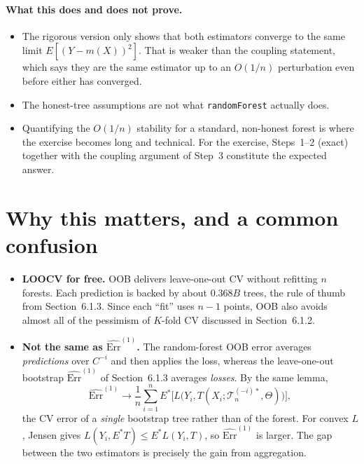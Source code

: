 \documentclass[11pt,a4paper]{article}
\theoremstyle{remark}
\newcommand{\cT}{\mathcal T}
\newcommand{\1}{\mathbf 1}
\newcommand{\Err}{\widehat{\mathrm{Err}}}
\newcommand{\Tmi}[1]{\cT^{(-i)*}_{#1}}
\begin{document}
\paragraph{What this does and does not prove.}
\begin{itemize}
\item The rigorous version only shows that both estimators converge to the same limit $E[(Y-m(X))^2]$. That is weaker than the coupling statement, which says they are the same estimator up to an $O(1/n)$ perturbation even before either has converged.
\item The honest-tree assumptions are not what \texttt{randomForest} actually does.
\item Quantifying the $O(1/n)$ stability for a standard, non-honest forest is where the exercise becomes long and technical. For the exercise, Steps~1--2 (exact) together with the coupling argument of Step~3 constitute the expected answer.
\end{itemize}

\section*{Why this matters, and a common confusion}

\begin{itemize}
\item \textbf{LOOCV for free.} OOB delivers leave-one-out CV without refitting $n$ forests. Each prediction is backed by about $0.368B$ trees, the rule of thumb from Section~6.1.3. Since each ``fit'' uses $n-1$ points, OOB also avoids almost all of the pessimism of $K$-fold CV discussed in Section~6.1.2.
\item \textbf{Not the same as $\Err^{(1)}$.} The random-forest OOB error averages \emph{predictions} over $C^{-i}$ and then applies the loss, whereas the leave-one-out bootstrap $\Err^{(1)}$ of Section~6.1.3 averages \emph{losses}. By the same lemma,
\[
\Err^{(1)}\longrightarrow\frac1n\sum_{i=1}^n E^*\big[L\big(Y_i,T(X_i;\Tmi{n},\Theta)\big)\big],
\]
the CV error of a \emph{single} bootstrap tree rather than of the forest. For convex $L$, Jensen gives $L(Y_i,E^*T)\le E^*L(Y_i,T)$, so $\Err^{(1)}$ is larger. The gap between the two estimators is precisely the gain from aggregation.
\end{itemize}
\end{document}
